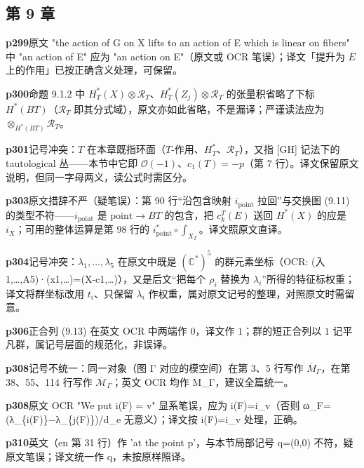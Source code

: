 \subsection*{第 9 章}

\noindent\textbf{\footnotesize p299}\quad 原文 "the action of G on X lifts to an action of E which is linear on fibers" 中 "an action of E" 应为 "an action on E"（原文或 OCR 笔误）；译文「提升为 $E$ 上的作用」已按正确含义处理，可保留。

\noindent\textbf{\footnotesize p300}\quad 命题 9.1.2 中 $H_T^*(X)\otimes\mathcal R_T$、$H_T^*(Z_j)\otimes\mathcal R_T$ 的张量积省略了下标 $H^*(BT)$（$\mathcal R_T$ 即其分式域），原文亦如此省略，不是漏译；严谨读法应为 $\otimes_{H^*(BT)}\mathcal R_T$。

\noindent\textbf{\footnotesize p301}\quad 记号冲突：$T$ 在本章既指环面（$T$-作用、$H_T^*$、$\mathcal R_T$），又指 [GH] 记法下的 tautological 丛——本节中它即 $\mathcal O(-1)$、$c_1(T)=-p$（第 7 行）。译文保留原文说明，但同一字母两义，读公式时需区分。

\noindent\textbf{\footnotesize p303}\quad 原文措辞不严（疑笔误）：第 90 行“沿包含映射 $i_{\mathrm{point}}$ 拉回”与交换图 (9.11) 的类型不符——$i_{\mathrm{point}}$ 是 $\mathrm{point}\to BT$ 的包含，把 $c_k^T(E)$ 送回 $H^*(X)$ 的应是 $i_X$；可用的整体运算是第 98 行的 $i_{\mathrm{point}}^*\circ\int_{X_T}$。译文照原文直译。

\noindent\textbf{\footnotesize p304}\quad 记号冲突：$\lambda_1,\ldots,\lambda_5$ 在原文中既是 $(\mathbb C^*)^5$ 的群元素坐标（OCR: (入1,…,A5)·(x1,…)=(X-c1,…)），又是后文“把每个 $\rho_i$ 替换为 $\lambda_i$”所得的特征标权重；译文将群坐标改用 $t_i$、只保留 $\lambda_i$ 作权重，属对原文记号的整理，对照原文时需留意。

\noindent\textbf{\footnotesize p306}\quad 正合列 (9.13) 在英文 OCR 中两端作 $0$，译文作 $1$；群的短正合列以 $1$ 记平凡群，属记号层面的规范化，非误译。

\noindent\textbf{\footnotesize p308}\quad 记号不统一：同一对象（图 Γ 对应的模空间）在第 3、5 行写作 $\overline M_\Gamma$，在第 38、55、114 行写作 $\overline{\mathcal M}_\Gamma$；英文 OCR 均作 M\_Γ，建议全篇统一。

\noindent\textbf{\footnotesize p308}\quad 原文 OCR "We put i(F) = v" 显系笔误，应为 i(F)=i\_v（否则 ω\_F=(λ\_\{i(F)\}−λ\_\{j(F)\})/d\_e 无意义）；译文按 i(F)=i\_v 处理，正确。

\noindent\textbf{\footnotesize p310}\quad 英文（en 第 31 行）作 'at the point p'，与本节局部记号 q=(0,0) 不符，疑原文笔误；译文统一作 q，未按原样照译。


